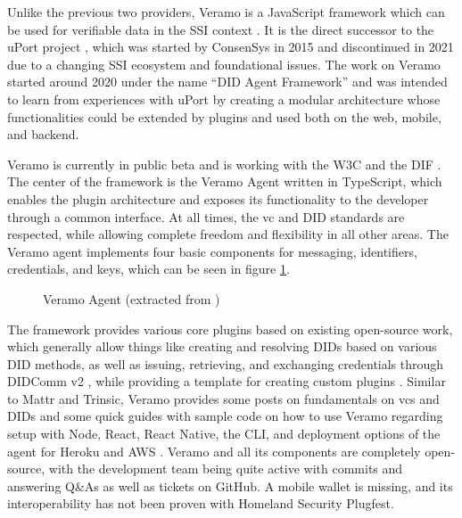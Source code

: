     Unlike the previous two providers, Veramo is a JavaScript framework which can be used for verifiable data in the \ac{SSI} context \cite{veramo_veramo_2021-1}. It is the direct successor to the uPort project \cite{uport_uport_2021}, which was started by ConsenSys in 2015 and discontinued in 2021 due to a changing \ac{SSI} ecosystem and foundational issues. The work on Veramo started around 2020 under the name “\ac{DID} Agent Framework” and was intended to learn from experiences with uPort by creating a modular architecture whose functionalities could be extended by plugins and used both on the web, mobile, and backend. \cite{uport_veramo_2021}
    
    Veramo is currently in public beta and is working with the W3C and the \ac{DIF} \cite{veramo_veramo_2021-1}. The center of the framework is the Veramo Agent written in TypeScript, which enables the plugin architecture and exposes its functionality to the developer through a common interface. At all times, the \ac{vc} and \ac{DID} standards are respected, while allowing complete freedom and flexibility in all other areas. The Veramo agent implements four basic components for messaging, identifiers, credentials, and keys, which can be seen in figure \ref{figure: veramo agent}. \cite{veramo_veramo_2021-2}
    
    \begin{figure}[ht]
	    \centering    	    \makebox[\textwidth]{}
        \caption[Veramo Agent]{Veramo Agent (extracted from \cite{veramo_veramo_2021-2})}
        \label{figure: veramo agent}
    \end{figure}
    
    The framework provides various core plugins based on existing open-source work, which generally allow things like creating and resolving \acp{DID} based on various \ac{DID} methods, as well as issuing, retrieving, and exchanging credentials through DIDComm v2 \cite{veramo_veramo_2021-2, veramo_blog_2021}, while providing a template for creating custom plugins \cite{veramo_uport-projectveramo-plugin_2021}. Similar to Mattr and Trinsic, Veramo provides some posts on fundamentals on \acp{vc} and \acp{DID} and some quick guides with sample code on how to use Veramo regarding setup with Node, React, React Native, the \ac{CLI}, and deployment options of the agent for Heroku and AWS \cite{veramo_veramo_2021-2}. Veramo and all its components are completely open-source, with the development team being quite active with commits and answering Q\&As as well as tickets on GitHub. A mobile wallet is missing, and its interoperability has not been proven \cite{homeland_security_interoperability_2021} with Homeland Security Plugfest.
    
